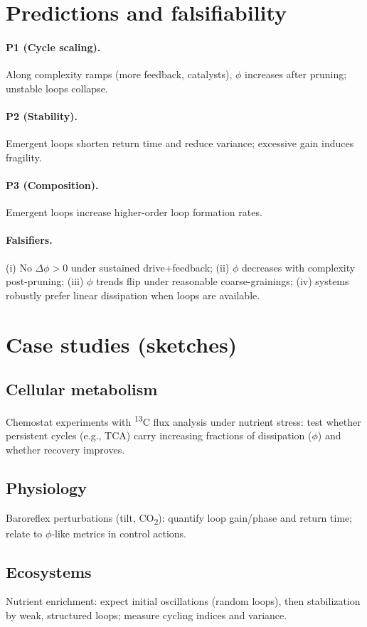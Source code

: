 \documentclass[11pt,a4paper]{article}
\newcommand{\phifrac}{\phi}
\begin{document}
\section{Predictions and falsifiability}
\paragraph{P1 (Cycle scaling).} Along complexity ramps (more feedback, catalysts), $\phifrac$ increases after pruning; unstable loops collapse.
\paragraph{P2 (Stability).} Emergent loops shorten return time and reduce variance; excessive gain induces fragility.
\paragraph{P3 (Composition).} Emergent loops increase higher-order loop formation rates.
\paragraph{Falsifiers.} (i) No $\Delta\phifrac>0$ under sustained drive+feedback; (ii) $\phifrac$ decreases with complexity post-pruning; (iii) $\phifrac$ trends flip under reasonable coarse-grainings; (iv) systems robustly prefer linear dissipation when loops are available.

\section{Case studies (sketches)}
\subsection{Cellular metabolism}
Chemostat experiments with \textsuperscript{13}C flux analysis under nutrient stress: test whether persistent cycles (e.g., TCA) carry increasing fractions of dissipation ($\phifrac$) and whether recovery improves.

\subsection{Physiology}
Baroreflex perturbations (tilt, CO\textsubscript{2}): quantify loop gain/phase and return time; relate to $\phifrac$-like metrics in control actions.

\subsection{Ecosystems}
Nutrient enrichment: expect initial oscillations (random loops), then stabilization by weak, structured loops; measure cycling indices and variance.
\end{document}
